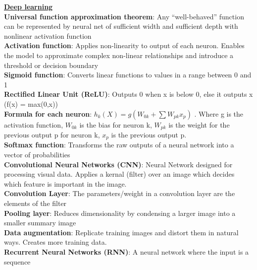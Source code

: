 \documentclass[a4paper,7pt,landscape]{extarticle}
\begin{document}
\begin{multicols}{3}
\begin{boxA}
\underline{\textbf{Deep learning}}\\
\textbf{Universal function approximation theorem}: Any “well-behaved” function can be represented by neural net of sufficient width and sufficient depth with nonlinear activation function\\
\textbf{Activation function}: Applies non-linearity to output of each neuron. Enables the model to approximate complex non-linear relationships and introduce a threshold or decision boundary\\
\textbf{Sigmoid function}: Converts linear functions to values in a range between 0 and 1\\
\textbf{Rectified Linear Unit (ReLU)}: Outputs 0 when x is below 0, else it outputs x (f(x) = max(0,x))\\
\textbf{Formula for each neuron}: $h_k(X) = g(W_{0k} + \sum W_{pk} x_p)$ . Where g is the activation function, $W_{0k}$ is the bias for neuron k, $W_{pk}$ is the weight for the previous output p for neuron k, $x_p$ is the previous output p.\\
\textbf{Softmax function}: Transforms the raw outputs of a neural network into a vector of probabilities\\
\textbf{Convolutional Neural Networks (CNN)}: Neural Network designed for processing visual data. Applies a kernal (filter) over an image which decides which feature is important in the image.\\
\textbf{Convolution Layer}: The parameters/weight in a convolution layer are the elements of the filter\\
\textbf{Pooling layer}: Reduces dimensionality by condensing a larger image into a smaller summary image\\
\textbf{Data augmentation}: Replicate training images and distort them in natural ways. Creates more training data.\\
\textbf{Recurrent Neural Networks (RNN)}: A neural network where the input is a sequence
\end{boxA}


\end{multicols}
\end{document}
